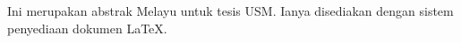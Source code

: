 \begin{MsAbstract}
Ini merupakan abstrak Melayu untuk tesis USM.  Ianya disediakan dengan sistem penyediaan dokumen \LaTeX.
\end{MsAbstract}